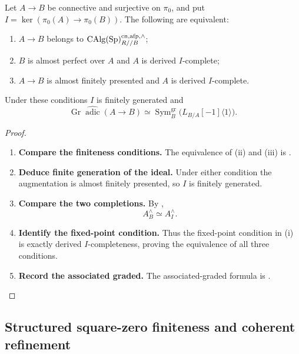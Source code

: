 \begin{proposition}
\label{prop:complete-aft-intrinsic-characterization}
Let \(A\to B\) be connective and surjective on \(\pi_0\), and put
\(I=\ker(\pi_0(A)\to\pi_0(B))\). The following are equivalent:
\begin{enumerate}[label=(\roman*)]
    \item \(A\to B\) belongs to
    \(\operatorname{CAlg}(\operatorname{Sp})^{\mathrm{cn},\mathrm{afp},\wedge}_{R//B}\);
    \item \(B\) is almost perfect over \(A\) and \(A\) is derived
    \(I\)-complete;
    \item \(A\to B\) is almost finitely presented and \(A\) is derived
    \(I\)-complete.
\end{enumerate}
Under these conditions \(I\) is finitely generated and
\[
    \operatorname{Gr}\widehat{\operatorname{adic}}(A\to B)
    \simeq
    \operatorname{Sym}^{\mathrm{gr}}_B
    \bigl(L_{B/A}[-1]\langle1\rangle\bigr).
\]
\end{proposition}

\begin{proof}
\leavevmode
\begin{enumerate}[label=\textup{(\arabic*)}]
    \item \textbf{Compare the finiteness conditions.}
    The equivalence of \textup{(ii)} and \textup{(iii)} is
    .
    \item \textbf{Deduce finite generation of the ideal.}
    Under either condition the
    augmentation is almost finitely presented, so \(I\) is finitely generated.
    \item \textbf{Compare the two completions.}
    By ,
    \[
        A_B^\wedge\simeq A_I^\wedge.
    \]
    \item \textbf{Identify the fixed-point condition.}
    Thus the fixed-point condition in \textup{(i)} is exactly derived
    \(I\)-completeness, proving the equivalence of all three conditions.
    \item \textbf{Record the associated graded.}
    The
    associated-graded formula is .
\end{enumerate}
\end{proof}

\subsection{Structured square-zero finiteness and coherent refinement}

